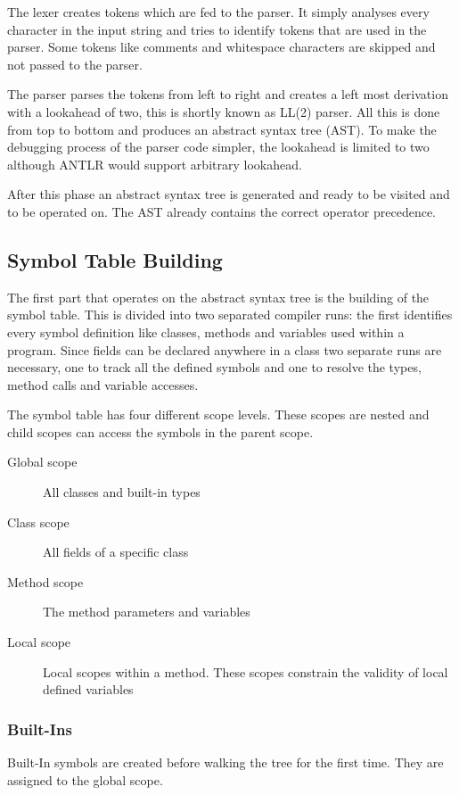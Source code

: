 The lexer creates tokens which are fed to the parser. It simply
analyses every character in the input string and tries to identify tokens
that are used in the parser. Some tokens like comments and whitespace characters 
are skipped and not passed to the parser.

The parser parses the tokens from left to right and creates a left most
derivation with a lookahead of two, this is shortly known as LL(2) parser.
All this is done from top to bottom and produces  an 
abstract syntax tree (AST). To make the debugging
process of the parser code simpler, the lookahead is limited to two although ANTLR
would support arbitrary lookahead.

After this phase an abstract syntax tree is generated and ready to be visited
and to be operated on. The AST already contains the correct operator precedence.

\subsection{Symbol Table Building}
The first part that operates on the abstract syntax tree is the building of
the symbol table. This is divided into two separated compiler runs: the
first identifies every symbol definition like classes, methods and
variables used within a program. Since fields can be declared anywhere
in a class two separate runs are necessary, one to track all the defined
symbols and one to resolve the types, method calls and variable accesses.

The symbol table has four different scope levels. These scopes are nested
and child scopes can access the symbols in the parent scope.
\begin{description}
	\item[Global scope] All classes and built-in types
	\item[Class scope] All fields of a specific class
	\item[Method scope] The method parameters and variables
	\item[Local scope] Local scopes within a method. These scopes
	constrain the validity of local defined variables
\end{description}

\subsubsection{Built-Ins}
Built-In symbols are created before walking the tree for the first time.
They are assigned to the global scope.

